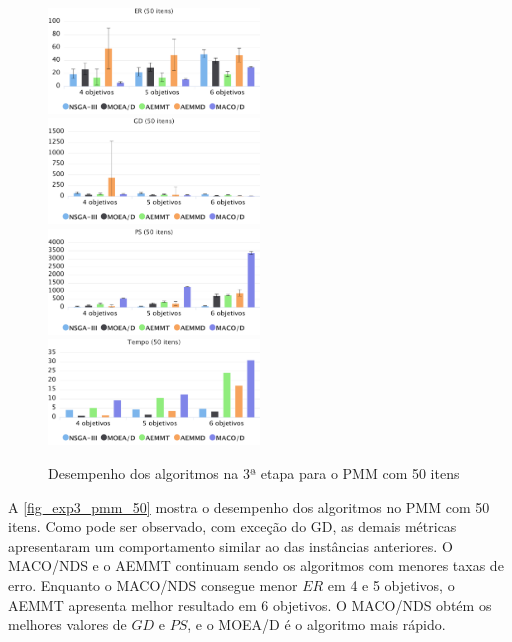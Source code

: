 \begin{figure}[!htbp]
	\includegraphics[width=0.5\textwidth]{cap_experimentos/figs/etapa3/er-mkp-50}
	\includegraphics[width=0.5\textwidth]{cap_experimentos/figs/etapa3/gd-mkp-50}
	\includegraphics[width=0.5\textwidth]{cap_experimentos/figs/etapa3/ps-mkp-50}
	\includegraphics[width=0.5\textwidth]{cap_experimentos/figs/etapa3/time-mkp-50}
	\caption{\label{fig_exp3_pmm_50}Desempenho dos algoritmos na 3ª etapa para o PMM com 50 itens}
\end{figure}

A \autoref{fig_exp3_pmm_50} mostra o desempenho dos algoritmos no PMM com 50 itens. Como pode ser observado, com exceção do GD, as demais métricas apresentaram um comportamento similar ao das instâncias anteriores. O MACO/NDS e o AEMMT continuam sendo os algoritmos com menores taxas de erro. Enquanto o MACO/NDS consegue menor $ER$ em 4 e 5 objetivos, o AEMMT apresenta melhor resultado em 6 objetivos. O MACO/NDS obtém os melhores valores de $GD$ e $PS$, e o MOEA/D é o algoritmo mais rápido.

